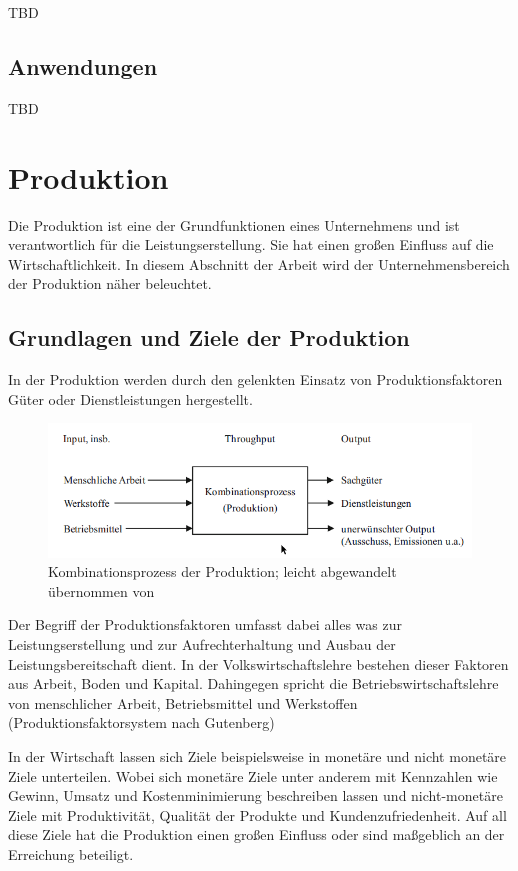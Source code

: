 \documentclass[a4paper,12pt, german]{report}
\begin{document}
TBD


\subsection{Anwendungen}
TBD


\section{Produktion}

Die Produktion ist eine der Grundfunktionen eines Unternehmens und ist verantwortlich für die Leistungserstellung. Sie hat einen großen Einfluss auf die Wirtschaftlichkeit. In diesem Abschnitt der Arbeit wird der Unternehmensbereich der Produktion näher beleuchtet.

\subsection{Grundlagen und Ziele der Produktion}

In der Produktion werden durch den gelenkten Einsatz von Produktionsfaktoren Güter oder Dienstleistungen hergestellt. \cite{12}

\begin{figure}[H]
  \center
 \includegraphics[width=14cm]{images/Kombinationsprozess.png}
  \caption[Kombinationsprozess der Produktion]{Kombinationsprozess der Produktion; leicht abgewandelt übernommen von \cite{13} }
\end{figure}

Der Begriff der Produktionsfaktoren umfasst dabei alles was zur Leistungserstellung und zur Aufrechterhaltung und Ausbau der Leistungsbereitschaft dient. In der Volkswirtschaftslehre bestehen dieser Faktoren aus Arbeit, Boden und Kapital. Dahingegen spricht die Betriebswirtschaftslehre von menschlicher Arbeit, Betriebsmittel und Werkstoffen (Produktionsfaktorsystem nach Gutenberg)

In der Wirtschaft lassen sich Ziele beispielsweise in monetäre und nicht monetäre Ziele unterteilen. Wobei sich monetäre Ziele unter anderem mit Kennzahlen wie Gewinn, Umsatz und Kostenminimierung beschreiben lassen und nicht-monetäre Ziele mit Produktivität, Qualität der Produkte und Kundenzufriedenheit. Auf all diese Ziele hat die Produktion einen großen Einfluss oder sind maßgeblich an der Erreichung beteiligt.
\end{document}
